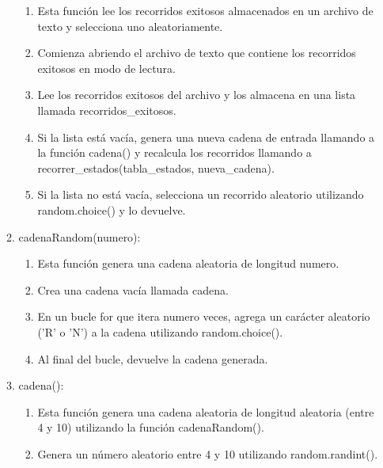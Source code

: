 \begin{enumerate}
\begin{enumerate}
    \begin{enumerate}
        \item Esta función lee los recorridos exitosos almacenados en un archivo de texto y selecciona uno aleatoriamente.\newline
        \item Comienza abriendo el archivo de texto que contiene los recorridos exitosos en modo de lectura.\newline
        \item Lee los recorridos exitosos del archivo y los almacena en una lista llamada recorridos\_exitosos.\newline
        \item Si la lista está vacía, genera una nueva cadena de entrada llamando a la función cadena() y recalcula los recorridos llamando a recorrer\_estados(tabla\_estados, nueva\_cadena).\newline
        \item Si la lista no está vacía, selecciona un recorrido aleatorio utilizando random.choice() y lo devuelve.\newline
    \end{enumerate}
    \item cadenaRandom(numero):\newline
    \begin{enumerate}
        \item Esta función genera una cadena aleatoria de longitud numero.\newline
        \item Crea una cadena vacía llamada cadena.\newline
        \item En un bucle for que itera numero veces, agrega un carácter aleatorio ('R' o 'N') a la cadena utilizando random.choice().\newline
        \item Al final del bucle, devuelve la cadena generada.\newline
    \end{enumerate}
    \item cadena():\newline
    \begin{enumerate}
        \item Esta función genera una cadena aleatoria de longitud aleatoria (entre 4 y 10) utilizando la función cadenaRandom().\newline
        \item Genera un número aleatorio entre 4 y 10 utilizando random.randint().\newline

\end{enumerate}
\end{enumerate}
\end{enumerate}
